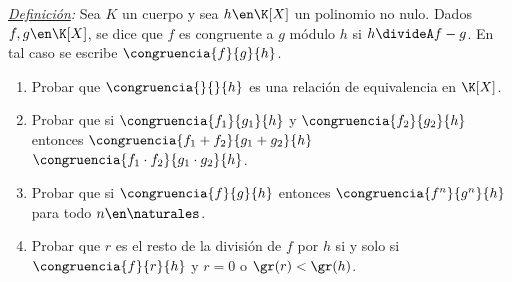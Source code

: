 \ejercicio

\textit{\underline {Definición}:} Sea $K$ un cuerpo y sea $h \en \K[X]$ un polinomio no nulo. Dados $f,g \en \K[X]$,
se dice que $f$ es congruente a $g$ módulo $h$ si $h \divideA f-g$. En tal caso se escribe $\congruencia{f}{g}{h}$.

\begin{enumerate}[label=\roman*)]
	\item Probar que $\congruencia{}{}{h}$ es una relación de equivalencia en $\K[X]$.

	\item Probar que si
	      $\congruencia{f_1}{g_1}{h}$ y
	      $\congruencia{f_2}{g_2}{h}$
	      entonces
	      $\congruencia{f_1 + f_2}{g_1 + g_2}{h}$
	      $\congruencia{f_1 \cdot f_2}{ g_1 \cdot g_2}{h}$.

	\item Probar que si $\congruencia{f}{g}{h}$ entonces $\congruencia{f^n}{g^n}{h}$ para todo $n \en \naturales$.

	\item Probar que $r$ es el resto de la división de $f$ por $h$ si y solo si $\congruencia{f}{r}{h}$ y $r=0$ o $\gr(r) < \gr(h)$.
\end{enumerate}

\separadorCorto

